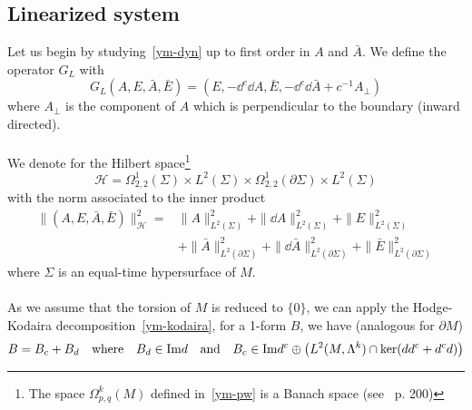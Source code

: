 \subsection{Linearized system}
Let us begin by studying~\cref{ym-dyn} up to first order in $A$ and $\bar{A}$. 
We define the operator $G_L$ with
\begin{equation}
G_L (A, E, \bar{A}, \bar{E}) = (E, -\dd^c \dd A, \bar{E}, -\dd^c \dd \bar{A} + c^{-1} A_\bot)
\end{equation}
where $A_\bot$ is the component of $A$ which is perpendicular to the boundary (inward directed). \\\\
%
%
We denote for the Hilbert space\footnote{
The space $\Omega^k_{p,q}(M)$ defined in~\cref{ym-pw} is a Banach space (see~\cite{Mazya2009} p. 200)
}
\begin{equation*}
\mathcal{H} = \Omega^{1}_{2,2}(\Sigma)\times L^2(\Sigma) \times \Omega^{1}_{2,2}(\partial \Sigma) \times L^2(\Sigma) 
\end{equation*}
with the norm associated to the inner product
\begin{equation}\label{ym-norm1}
\begin{split}
\| (A,E,\bar{A},\bar{E}) \|^2_{\mathcal{H}} = &
\| A\|^2_{L^2(\Sigma)} + \|\dd A\|^2_{L^2(\Sigma)}  + \| E \|^2_{L^2(\Sigma)} \\ & +
\| \bar{A}\|^2_{L^2(\partial \Sigma)} + \|\dd \bar{A}\|^2_{L^2(\partial \Sigma)}  + \| \bar{E} \|^2_{L^2(\partial \Sigma)}
\end{split}
\end{equation}
where $\Sigma$ is an equal-time hypersurface of $M$. 
\\\\
%
As we assume that the torsion of $M$ is reduced to $\{0\}$, we can apply the Hodge-Kodaira decomposition~\cref{ym-kodaira}, \ie for a 1-form $B$, we have (analogous for $\partial M$)
\begin{equation*}
B = B_c + B_d
\quad\textrm{where}\quad
B_d\in\mathrm{Im} d
\quad\textrm{and}\quad
B_c\in\mathrm{Im} d^c\oplus\big(L^2(M,\Lambda^k)\cap\ker(d d^c+d^c d)\big)
\end{equation*}
